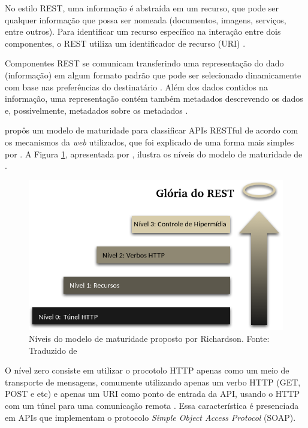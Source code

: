   No estilo REST, uma informação é abstraída em um recurso, que pode ser qualquer informação que possa ser nomeada
  (documentos, imagens, serviços, entre outros). Para identificar um recurso específico na interação entre dois
  componentes, o REST utiliza um identificador de recurso (URI) \cite{fielding2002}.
  
  Componentes REST se comunicam transferindo uma representação do dado (informação) em algum formato padrão que pode
  ser selecionado dinamicamente com base nas preferências do destinatário \cite{fielding2002}. Além dos dados contidos na 
  informação, uma representação contém também metadados descrevendo os dados e, possivelmente, metadados sobre os
  metadados \cite{fielding2002}.
  
       propôs um modelo de maturidade para classificar
      APIs RESTful de acordo com os mecanismos da \textit{web} utilizados,
      que foi explicado de uma forma mais simples por .
      A Figura \ref{fig:glory_of_rest}, apresentada por ,
      ilustra os níveis do modelo de maturidade de .
	
      \begin{figure}[h!]
	\centering
	\includegraphics[scale=0.5]{figuras/glory_of_rest.png}
	\caption{Níveis do modelo de maturidade proposto por Richardson. Fonte: Traduzido de \cite{fowler10}}
	\label{fig:glory_of_rest}
      \end{figure}
      
      O nível zero consiste em utilizar o procotolo HTTP apenas como um meio de transporte de mensagens,
      comumente utilizando apenas um verbo HTTP (GET, POST e etc) e apenas um URI como ponto de entrada da API, 
      usando o HTTP com um túnel para uma comunicação remota \cite{fowler10} \cite{richardson09}.
      Essa característica é presenciada em APIs que implementam o protocolo \textit{Simple Object Access Protocol} (SOAP).
      
